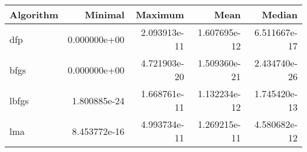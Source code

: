 \begin{tabular}{lrrrr}
\toprule
Algorithm &      Minimal &      Maximum &         Mean &       Median \\
\midrule
      dfp & 0.000000e+00 & 2.093913e-11 & 1.607695e-12 & 6.511667e-17 \\
     bfgs & 0.000000e+00 & 4.721903e-20 & 1.509360e-21 & 2.434740e-26 \\
    lbfgs & 1.800885e-24 & 1.668761e-11 & 1.132234e-12 & 1.745420e-13 \\
      lma & 8.453772e-16 & 4.993734e-11 & 1.269215e-11 & 4.580682e-12 \\
\bottomrule
\end{tabular}
